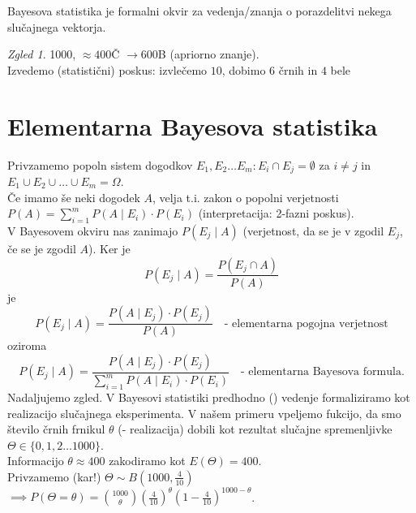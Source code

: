 \documentclass[a4paper, 12pt]{book}
\theoremstyle{definition}
\theoremstyle{remark}
\newtheorem*{exmp}{Zgled}
\begin{document}
Bayesova statistika je formalni okvir za  vedenja/znanja o porazdelitvi nekega slučajnega vektorja.
\begin{exmp}
  1000, $\approx 400$Č $\to 600$B (apriorno znanje). \\
  Izvedemo (statistični) poskus: izvlečemo $10$, dobimo $6$ črnih in $4$ bele
\end{exmp}


\section{Elementarna Bayesova statistika}

Privzamemo popoln sistem dogodkov $E_1, E_2 \dots E_m: E_i \cap E_j = \emptyset$ za $i \neq j$ in
$E_1 \cup E_2 \cup \dots \cup E_m = \Omega$. \\
Če imamo še neki dogodek $A$, velja t.i. zakon o popolni verjetnosti \\
$P(A) = \sum_{i=1}^{m} P(A \mid E_i) \cdot P(E_i)$ (interpretacija: 2-fazni poskus). \\
V Bayesovem okviru nas zanimajo $P(E_j \mid A)$ (verjetnost, da se je v  zgodil $E_j$,
če se je  zgodil $A$).
Ker je
\begin{equation*}
  P(E_j \mid A) = \frac{P(E_j \cap A)}{P(A)}
\end{equation*}
je
\begin{equation*}
  P(E_j \mid A) = \frac{P(A \mid E_j) \cdot P(E_j)}{P(A)} \quad \text{- elementarna pogojna verjetnost}
\end{equation*}
oziroma
\begin{equation*}
  P(E_j \mid A) = \frac{P(A \mid E_j) \cdot P(E_j)}{\sum_{i=1}^{m} P(A \mid E_i) \cdot P(E_i)}
    \quad \text{- elementarna Bayesova formula.}
\end{equation*}
Nadaljujemo zgled. V Bayesovi statistiki predhodno () vedenje formaliziramo kot realizacijo slučajnega eksperimenta.
V našem primeru vpeljemo fukcijo, da smo število črnih frnikul $\theta$ (- realizacija) dobili kot rezultat
slučajne spremenljivke $\Theta \in \{0, 1, 2 \dots 1000\}$. \\
Informacijo $\theta \approx 400$ zakodiramo kot $E(\Theta) = 400$. \\
Privzamemo (kar!) $\Theta \sim B\left(1000, \frac{4}{10}\right)$ \\
$\implies P(\Theta = \theta) = \binom{1000}{\theta} \left(\frac{4}{10}\right)^{\theta} \left(1-\frac{4}{10}\right)^{1000-\theta}$. \\
\end{document}
